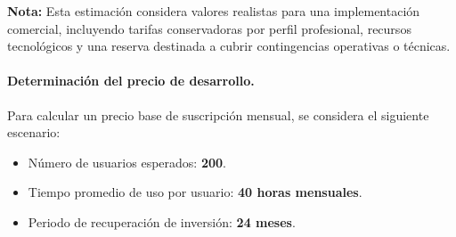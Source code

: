 \begin{table}[H]
	\centering
	\renewcommand{\arraystretch}{1.5}
	\setlength{\tabcolsep}{12pt}
	\caption[Proyección de costos para una posible fase comercial]{Proyección de costos para una posible fase comercial, elaboración propia.}	
	\label{tab:costos_desarrollo}
\end{table}

\noindent \textbf{Nota:} Esta estimación considera valores realistas para una implementación comercial, incluyendo tarifas conservadoras por perfil profesional, recursos tecnológicos y una reserva destinada a cubrir contingencias operativas o técnicas.

\paragraph{\textbf{Determinación del precio de desarrollo.}}

Para calcular un precio base de suscripción mensual, se considera el siguiente escenario:

\begin{itemize}
	\item Número de usuarios esperados: \textbf{200}.
	\item Tiempo promedio de uso por usuario: \textbf{40 horas mensuales}.
	\item Periodo de recuperación de inversión: \textbf{24 meses}.
\end{itemize}

